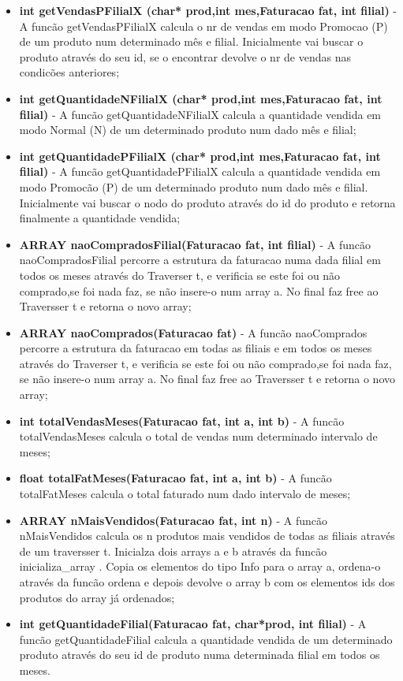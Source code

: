 \begin{itemize}
\item	\textbf{int getVendasPFilialX (char* prod,int mes,Faturacao fat, int filial)} - A funcão getVendasPFilialX calcula o nr de vendas em modo Promocao (P) de um produto num determinado mês e filial. Inicialmente vai buscar o produto através do seu id, se o encontrar devolve o nr de vendas nas condicões anteriores; 

\item	\textbf{int getQuantidadeNFilialX (char* prod,int mes,Faturacao fat, int filial)} - A funcão getQuantidadeNFilialX calcula a quantidade vendida em modo Normal (N) de um determinado produto num dado mês e filial;

\item	\textbf{int getQuantidadePFilialX (char* prod,int mes,Faturacao fat, int filial)} - A funcão getQuantidadePFilialX calcula a quantidade vendida em modo Promocão (P) de um determinado produto num dado mês e filial. Inicialmente vai buscar o nodo do produto através do id do produto e retorna finalmente a quantidade vendida; 

\item	\textbf{ARRAY naoCompradosFilial(Faturacao fat, int filial)} - A funcão naoCompradosFilial percorre a estrutura da faturacao numa dada filial em todos os meses através do Traverser t, e verificia se este foi ou não comprado,se foi nada faz, se não insere-o num array a. No final faz free ao Traversser t e retorna o novo array; 

\item	\textbf{ARRAY naoComprados(Faturacao fat)} - A funcão naoComprados percorre  a estrutura da faturacao em todas as filiais e em todos os meses através do Traverser t, e verificia se este foi ou não comprado,se foi nada faz, se não insere-o num array a. No final faz free ao Traversser t e retorna o novo array; 

\item	\textbf{int totalVendasMeses(Faturacao fat, int a, int b)} - A funcão totalVendasMeses calcula o total de vendas num determinado intervalo de meses;

\item	\textbf{float totalFatMeses(Faturacao fat, int a, int b)} - A funcão totalFatMeses calcula o total faturado num dado intervalo de meses; 

\item	\textbf{ARRAY nMaisVendidos(Faturacao fat, int n)} - A funcão nMaisVendidos calcula os n produtos mais vendidos de todas as filiais através de um traversser t. Inicialza dois arrays a e b através da funcão inicializa\_array . Copia os elementos do tipo Info para o array a, ordena-o através da funcão ordena e depois devolve o array b com os elementos ids dos produtos do array já ordenados; 

\item	\textbf{int getQuantidadeFilial(Faturacao fat, char*prod, int filial)} - A funcão getQuantidadeFilial calcula a quantidade vendida de um determinado produto através do seu id de produto numa determinada filial em todos os meses. 
	
\end{itemize}


